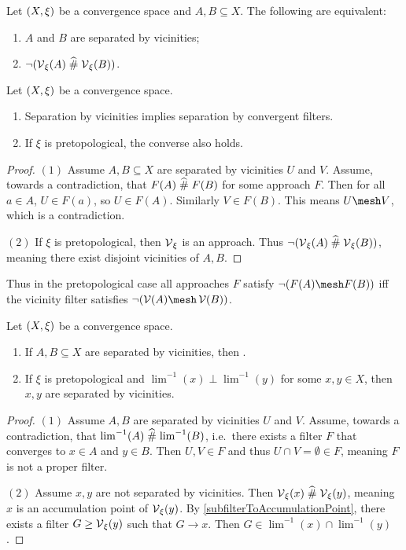 \begin{lemma}
Let $\left( X,\xi \right)$ be a convergence space and $A,B\subseteq X$. The following are equivalent:
\begin{enumerate}
\item $A$ and $B$ are separated by vicinities;
\item $\neg(\operatorname{\mathcal{V}}_\xi(A)\mathrel{\widehat{\#}} \operatorname{\mathcal{V}}_\xi(B))$.
\end{enumerate}
\end{lemma}

\begin{proposition} \label{disjointVicinitiesConvergentFilterSeparation}
Let $\left( X,\xi \right)$ be a convergence space.
\begin{enumerate}
\item Separation by vicinities implies separation by convergent filters.
\item If $\xi$ is pretopological, the converse also holds.
\end{enumerate}
\end{proposition}
\begin{proof}
$(1)$ Assume $A,B\subseteq X$ are separated by vicinities $U$ and $V$. Assume, towards a contradiction, that $F(A)\mathrel{\widehat{\#}} F(B)$ for some approach $F$. Then for all $a\in A$, $U\in F(a)$, so $U\in F(A)$. Similarly $V\in F(B)$. This means $U\mesh V$, which is a contradiction.

$(2)$ If $\xi$ is pretopological, then $\operatorname{\mathcal{V}}_\xi$ is an approach. Thus $\neg(\operatorname{\mathcal{V}}_\xi(A)\mathrel{\widehat{\#}} \operatorname{\mathcal{V}}_\xi(B))$, meaning there exist disjoint vicinities of $A,B$.
\end{proof}
Thus in the pretopological case all approaches $F$ satisfy $\neg(F(A)\mesh F(B))$ iff the vicinity filter satisfies $\neg(\vicinity(A)\mesh \vicinity(B))$.


\begin{proposition} \label{separationByVicinitiesEquivalences}
Let $\left( X,\xi \right)$ be a convergence space.
\begin{enumerate}
\item If $A,B \subseteq X$ are separated by vicinities, then .
\item If $\xi$ is pretopological and $\lim^{-1}(x)\perp \lim^{-1}(y)$ for some $x,y\in X$, then $x,y$ are separated by vicinities.
\end{enumerate}
\end{proposition}
\begin{proof}
$(1)$ Assume $A,B$ are separated by vicinities $U$ and $V$. Assume, towards a contradiction, that $\lim^{-1}(A)\mathrel{\widehat{\#}} \lim^{-1}(B)$, i.e.\ there exists a filter $F$ that converges to $x\in A$ and $y\in B$. Then $U,V\in F$ and thus $U\cap V = \emptyset \in F$, meaning $F$ is not a proper filter.

$(2)$ Assume $x,y$ are not separated by vicinities. Then $\operatorname{\mathcal{V}}_\xi(x)\mathrel{\widehat{\#}} \operatorname{\mathcal{V}}_\xi(y)$, meaning $x$ is an accumulation point of $\operatorname{\mathcal{V}}_\xi(y)$. By \ref{subfilterToAccumulationPoint}, there exists a filter $G\geq \operatorname{\mathcal{V}}_\xi(y)$ such that $G\to x$. Then $G\in \lim^{-1}(x)\cap \lim^{-1}(y)$.
\end{proof}

